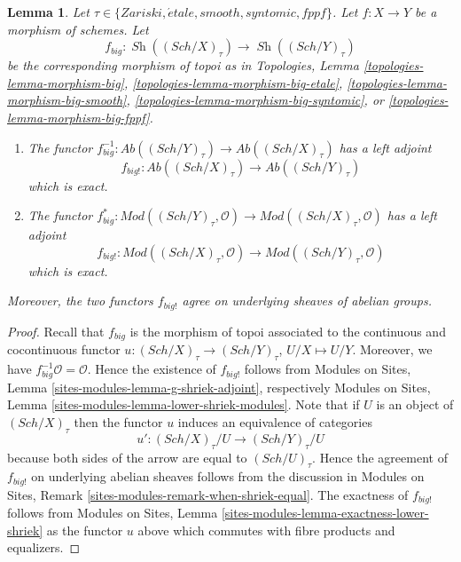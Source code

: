 \documentclass[10pt,a4paper]{amsart}
\theoremstyle{plain}
\newtheorem{lemma}[subsection]{Lemma}
\theoremstyle{definition}
\theoremstyle{remark}
\numberwithin{equation}{subsection}
\def\Sch{\mathit{Sch}}
\def\Sh{\mathop{\mathit{Sh}}\nolimits}
\def\etale{{\acute{e}tale}}
\begin{document}
\begin{lemma}
\label{lemma-exactness-lower-shriek}
Let $\tau \in \{Zariski, \etale, smooth, syntomic, fppf\}$.
Let $f : X \to Y$ be a morphism of schemes. Let
$$
f_{big} :
\Sh((\Sch/X)_\tau)
\longrightarrow
\Sh((\Sch/Y)_\tau)
$$
be the corresponding morphism of topoi as in
Topologies, Lemma
\ref{topologies-lemma-morphism-big},
\ref{topologies-lemma-morphism-big-etale},
\ref{topologies-lemma-morphism-big-smooth},
\ref{topologies-lemma-morphism-big-syntomic}, or
\ref{topologies-lemma-morphism-big-fppf}.
\begin{enumerate}
\item The functor
$f_{big}^{-1} : \textit{Ab}((\Sch/Y)_\tau) \to \textit{Ab}((\Sch/X)_\tau)$
has a left adjoint
$$
f_{big!} : \textit{Ab}((\Sch/X)_\tau) \to \textit{Ab}((\Sch/Y)_\tau)
$$
which is exact.
\item The functor
$f_{big}^* :
\textit{Mod}((\Sch/Y)_\tau, \mathcal{O})
\to
\textit{Mod}((\Sch/X)_\tau, \mathcal{O})$
has a left adjoint
$$
f_{big!} :
\textit{Mod}((\Sch/X)_\tau, \mathcal{O})
\to
\textit{Mod}((\Sch/Y)_\tau, \mathcal{O})
$$
which is exact.
\end{enumerate}
Moreover, the two functors $f_{big!}$ agree on underlying sheaves
of abelian groups.
\end{lemma}

\begin{proof}
Recall that $f_{big}$ is the morphism of topoi associated to the
continuous and cocontinuous functor
$u : (\Sch/X)_\tau \to (\Sch/Y)_\tau$, $U/X \mapsto U/Y$.
Moreover, we have $f_{big}^{-1}\mathcal{O} = \mathcal{O}$.
Hence the existence of $f_{big!}$ follows from
Modules on Sites, Lemma \ref{sites-modules-lemma-g-shriek-adjoint},
respectively
Modules on Sites, Lemma \ref{sites-modules-lemma-lower-shriek-modules}.
Note that if $U$ is an object of $(\Sch/X)_\tau$ then the functor
$u$ induces an equivalence of categories
$$
u' :
(\Sch/X)_\tau/U
\longrightarrow
(\Sch/Y)_\tau/U
$$
because both sides of the arrow are equal to $(\Sch/U)_\tau$.
Hence the agreement of $f_{big!}$ on underlying abelian sheaves
follows from the discussion in
Modules on Sites, Remark \ref{sites-modules-remark-when-shriek-equal}.
The exactness of $f_{big!}$ follows from
Modules on Sites, Lemma \ref{sites-modules-lemma-exactness-lower-shriek}
as the functor $u$ above which commutes with fibre products and equalizers.
\end{proof}
\end{document}
